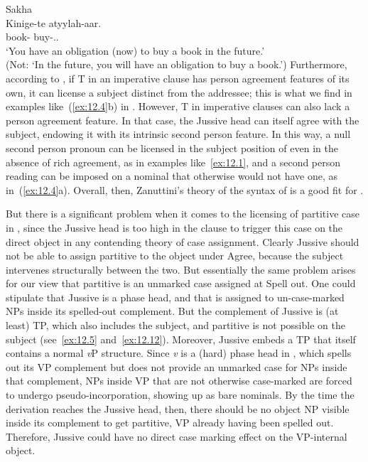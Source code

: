 \documentclass[output=paper]{langsci/langscibook}
\begin{document}
\ea\label{ex:12.13}Sakha\\
	\gll Kinige-te  atyylah-aar.\\
        book-\Part{}  buy-\Fut{}.\Imp{}.\Ssg{}\\
	\glt ‘You have an obligation (now) to buy a book in the future.’\\
		(Not: ‘In the future, you will have an obligation to buy a book.’)
\z
Furthermore, according to \citet{Zanuttini2008}, if T in an imperative clause
has person agreement features of its own, it can license a subject distinct
from the addressee; this is what we find in examples like~(\ref{ex:12.4}b) in .
However, T in imperative clauses can also lack a person agreement feature. In
that case, the Jussive head can itself agree with the subject, endowing it with
its intrinsic second person feature. In this way, a null second person pronoun
can be licensed in the subject position of  even in the absence of
rich agreement, as in examples like~\eqref{ex:12.1}, and a second person reading can be
imposed on a nominal that otherwise would not have one, as in~(\ref{ex:12.4}a). Overall,
then, Zanuttini’s theory of the syntax of  is a good fit for .

But there is a significant problem when it comes to the licensing of partitive
case in  , since the Jussive head is too high in the clause to
trigger this case on the direct object in any contending theory of case
assignment. Clearly Jussive should not be able to assign partitive to the
object under Agree, because the subject intervenes structurally between the
two. But essentially the same problem arises for our view that partitive is an
unmarked case assigned at Spell out. One could stipulate that Jussive is a
phase head, and that  is assigned to un-case-marked NPs inside
its spelled-out complement. But the complement of Jussive is (at least) TP,
which also includes the subject, and partitive is not possible on the subject
(see~\ref{ex:12.5} and~\ref{ex:12.12}). Moreover, Jussive embeds a TP that itself contains a normal
\emph{v}P structure. Since \emph{v} is a (hard) phase head in , which spells out its VP
complement but does not provide an unmarked case for NPs inside that
complement, NPs inside VP that are not otherwise case-marked are forced to
undergo pseudo-incorporation, showing up as bare nominals. By the time the
derivation reaches the Jussive head, then, there should be no object NP visible
inside its complement to get partitive, VP already having been spelled out.
Therefore, Jussive could have no direct case marking effect on the VP-internal
object.
\end{document}
